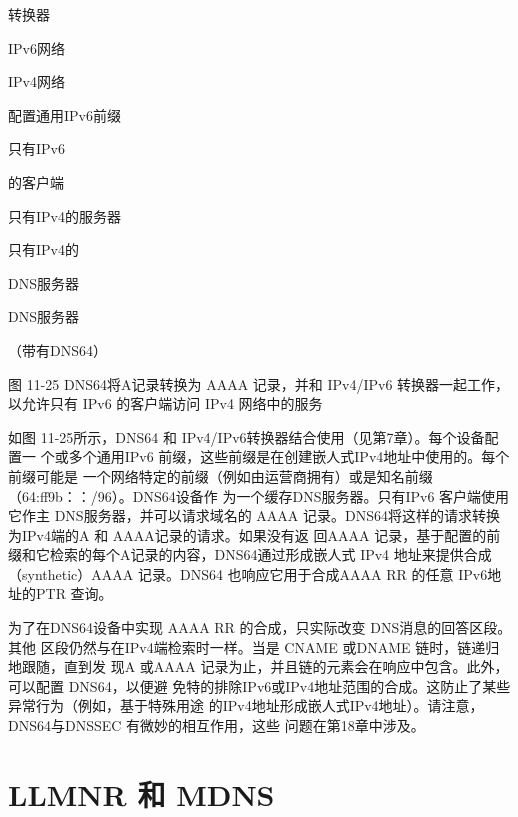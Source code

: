 转换器

IPv6网络

IPv4网络

配置通用IPv6前缀

只有IPv6

的客户端

只有IPv4的服务器

只有IPv4的

DNS服务器

DNS服务器

（带有DNS64）

图 11-25 DNS64将A记录转换为 AAAA 记录，并和 IPv4/IPv6 转换器一起工作，
以允许只有 IPv6 的客户端访问 IPv4 网络中的服务

如图 11-25所示，DNS64 和 IPv4/IPv6转换器结合使用（见第7章）。每个设备配置一
个或多个通用IPv6 前缀，这些前缀是在创建嵌人式IPv4地址中使用的。每个前缀可能是
一个网络特定的前缀（例如由运营商拥有）或是知名前缀（64:ff9b：：/96）。DNS64设备作
为一个缓存DNS服务器。只有IPv6 客户端使用它作主 DNS服务器，并可以请求域名的
AAAA 记录。DNS64将这样的请求转换为IPv4端的A 和 AAAA记录的请求。如果没有返
回AAAA 记录，基于配置的前缀和它检索的每个A记录的内容，DNS64通过形成嵌人式
IPv4 地址来提供合成（synthetic）AAAA 记录。DNS64 也响应它用于合成AAAA RR 的任意
IPv6地址的PTR 查询。

为了在DNS64设备中实现 AAAA RR 的合成，只实际改变 DNS消息的回答区段。其他
区段仍然与在IPv4端检索时一样。当是 CNAME 或DNAME 链时，链递归地跟随，直到发
现A 或AAAA 记录为止，并且链的元素会在响应中包含。此外，可以配置 DNS64，以便避
免特的排除IPv6或IPv4地址范围的合成。这防止了某些异常行为（例如，基于特殊用途
的IPv4地址形成嵌人式IPv4地址）。请注意，DNS64与DNSSEC 有微妙的相互作用，这些
问题在第18章中涉及。

\section{LLMNR 和 MDNS}

